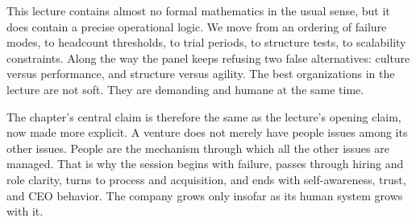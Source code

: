 This lecture contains almost no formal mathematics in the usual sense, but it does contain a precise operational logic. We move from an ordering of failure modes, to headcount thresholds, to trial periods, to structure tests, to scalability constraints. Along the way the panel keeps refusing two false alternatives: culture versus performance, and structure versus agility. The best organizations in the lecture are not soft. They are demanding and humane at the same time.

The chapter's central claim is therefore the same as the lecture's opening claim, now made more explicit. A venture does not merely have people issues among its other issues. People are the mechanism through which all the other issues are managed. That is why the session begins with failure, passes through hiring and role clarity, turns to process and acquisition, and ends with self-awareness, trust, and CEO behavior. The company grows only insofar as its human system grows with it.